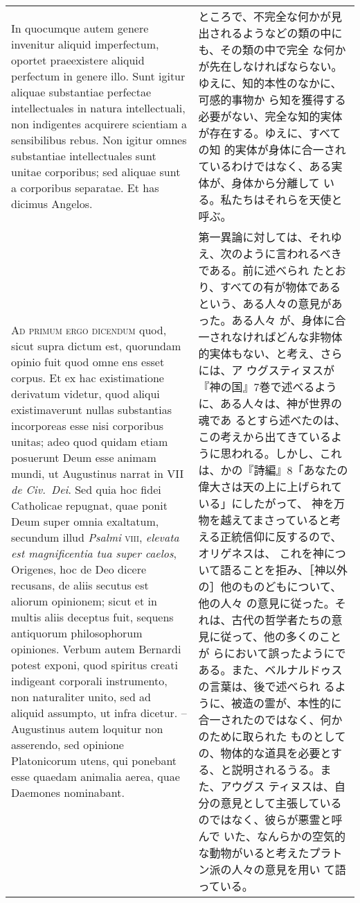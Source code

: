 \documentclass[10pt]{jsarticle} %
\begin{document}
\begin{longtable}{p{21em}p{21em}}
\\



In quocumque autem genere invenitur aliquid
imperfectum, oportet praeexistere aliquid perfectum in genere illo. Sunt
igitur aliquae substantiae perfectae intellectuales in natura
intellectuali, non indigentes acquirere scientiam a sensibilibus
rebus. Non igitur omnes substantiae intellectuales sunt unitae
corporibus; sed aliquae sunt a corporibus separatae. Et has dicimus
Angelos.


&

ところで、不完全な何かが見出されるようなどの類の中にも、その類の中で完全
 な何かが先在しなければならない。ゆえに、知的本性のなかに、可感的事物か
 ら知を獲得する必要がない、完全な知的実体が存在する。ゆえに、すべての知
 的実体が身体に合一されているわけではなく、ある実体が、身体から分離して
 いる。私たちはそれらを天使と呼ぶ。

\\


{\scshape Ad primum ergo dicendum} quod, sicut supra dictum est,
quorundam opinio fuit quod omne ens esset corpus. Et ex hac
existimatione derivatum videtur, quod aliqui existimaverunt nullas
substantias incorporeas esse nisi corporibus unitas; adeo quod quidam
etiam posuerunt Deum esse animam mundi, ut Augustinus narrat in VII
{\itshape de Civ.~Dei}. Sed quia hoc fidei Catholicae repugnat, quae
ponit Deum super omnia exaltatum, secundum illud {\itshape Psalmi}
{\scshape viii}, {\itshape elevata est magnificentia tua super caelos},
Origenes, hoc de Deo dicere recusans, de aliis secutus est aliorum
opinionem; sicut et in multis aliis deceptus fuit, sequens antiquorum
philosophorum opiniones. Verbum autem Bernardi potest exponi, quod
spiritus creati indigeant corporali instrumento, non naturaliter unito,
sed ad aliquid assumpto, ut infra dicetur. -- Augustinus autem loquitur non
asserendo, sed opinione Platonicorum utens, qui ponebant esse quaedam
animalia aerea, quae Daemones nominabant.


&

第一異論に対しては、それゆえ、次のように言われるべきである。前に述べられ
たとおり、すべての有が物体であるという、ある人々の意見があった。ある人々
が、身体に合一されなければどんな非物体的実体もない、と考え、さらには、ア
ウグスティヌスが『神の国』7巻で述べるように、ある人々は、神が世界の魂であ
るとすら述べたのは、この考えから出てきているように思われる。しかし、これ
は、かの『詩編』8「あなたの偉大さは天の上に上げられている」にしたがって、
神を万物を越えてまさっていると考える正統信仰に反するので、オリゲネスは、
これを神について語ることを拒み、［神以外の］他のものどもについて、他の人々
の意見に従った。それは、古代の哲学者たちの意見に従って、他の多くのことが
らにおいて誤ったようにである。また、ベルナルドゥスの言葉は、後で述べられ
るように、被造の霊が、本性的に合一されたのではなく、何かのために取られた
ものとしての、物体的な道具を必要とする、と説明されるうる。また、アウグス
 ティヌスは、自分の意見として主張しているのではなく、彼らが悪霊と呼んで
 いた、なんらかの空気的な動物がいると考えたプラトン派の人々の意見を用い
 て語っている。



\end{longtable}
\end{document}
